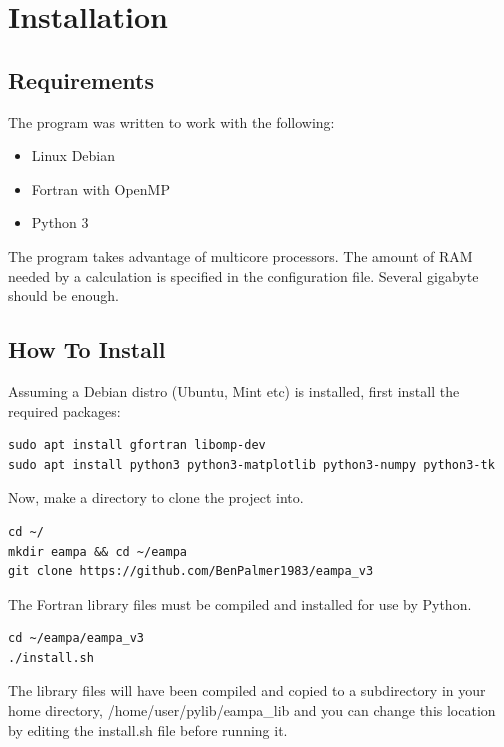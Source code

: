 \documentclass[12pt,twoside]{manual}
\begin{document}


\chapter{Installation}

\section{Requirements}

The program was written to work with the following:

\begin{itemize}
\item Linux Debian
\item Fortran with OpenMP
\item Python 3
\end{itemize}


The program takes advantage of multicore processors.  The amount of RAM needed by a calculation is specified in the configuration file.  Several gigabyte should be enough.



\section{How To Install}

Assuming a Debian distro (Ubuntu, Mint etc) is installed, first install the required packages:

\begin{lstlisting}
sudo apt install gfortran libomp-dev
sudo apt install python3 python3-matplotlib python3-numpy python3-tk
\end{lstlisting}

Now, make a directory to clone the project into.

\begin{lstlisting}
cd ~/
mkdir eampa && cd ~/eampa
git clone https://github.com/BenPalmer1983/eampa_v3
\end{lstlisting}

The Fortran library files must be compiled and installed for use by Python.

\begin{lstlisting}
cd ~/eampa/eampa_v3
./install.sh
\end{lstlisting}

The library files will have been compiled and copied to a subdirectory in your home directory, /home/user/pylib/eampa\_lib and you can change this location by editing the install.sh file before running it.
\end{document}
